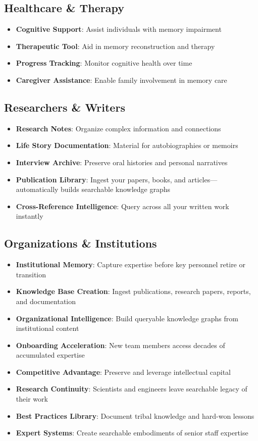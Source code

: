 \documentclass[11pt,letterpaper]{article}
\begin{document}
\subsection{Healthcare \& Therapy}
\begin{itemize}[leftmargin=*]
    \item \textbf{Cognitive Support}: Assist individuals with memory impairment
    \item \textbf{Therapeutic Tool}: Aid in memory reconstruction and therapy
    \item \textbf{Progress Tracking}: Monitor cognitive health over time
    \item \textbf{Caregiver Assistance}: Enable family involvement in memory care
\end{itemize}

\subsection{Researchers \& Writers}
\begin{itemize}[leftmargin=*]
    \item \textbf{Research Notes}: Organize complex information and connections
    \item \textbf{Life Story Documentation}: Material for autobiographies or memoirs
    \item \textbf{Interview Archive}: Preserve oral histories and personal narratives
    \item \textbf{Publication Library}: Ingest your papers, books, and articles---automatically builds searchable knowledge graphs
    \item \textbf{Cross-Reference Intelligence}: Query across all your written work instantly
\end{itemize}

\subsection{Organizations \& Institutions}
\begin{itemize}[leftmargin=*]
    \item \textbf{Institutional Memory}: Capture expertise before key personnel retire or transition
    \item \textbf{Knowledge Base Creation}: Ingest publications, research papers, reports, and documentation
    \item \textbf{Organizational Intelligence}: Build queryable knowledge graphs from institutional content
    \item \textbf{Onboarding Acceleration}: New team members access decades of accumulated expertise
    \item \textbf{Competitive Advantage}: Preserve and leverage intellectual capital
    \item \textbf{Research Continuity}: Scientists and engineers leave searchable legacy of their work
    \item \textbf{Best Practices Library}: Document tribal knowledge and hard-won lessons
    \item \textbf{Expert Systems}: Create searchable embodiments of senior staff expertise
\end{itemize}
\end{document}
